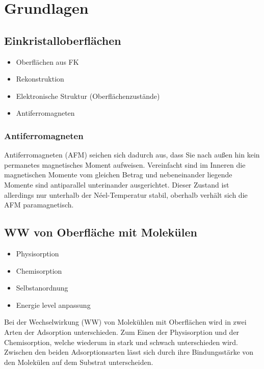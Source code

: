 \chapter{Grundlagen}
    \section{Einkristalloberflächen}
        \begin{itemize}
            \item Oberflächen aus FK
            \item Rekonstruktion
            \item Elektronische Struktur (Oberflächenzustände)
            \item Antiferromagneten
        \end{itemize}
        \subsection{Antiferromagneten}
        Antiferromagneten (AFM) seichen sich dadurch aus, dass Sie nach außen hin kein permanetes magnetisches Moment aufweisen.
        Vereinfacht sind im Inneren die magnetischen Momente vom gleichen Betrag und nebeneinander liegende Momente sind antiparallel unterinander ausgerichtet.
        Dieser Zustand ist allerdings nur unterhalb der Néel-Temperatur stabil, oberhalb verhält sich die AFM paramagnetisch.
    
    \section{WW von Oberfläche mit Molekülen}
        \cite{ma-DJ}
        \begin{itemize}
            \item Physisorption
            \item Chemisorption
            \item Selbstanordnung
            \item Energie level anpassung
        \end{itemize}
        Bei der Wechselwirkung (WW) von Molekühlen mit Oberflächen wird in zwei Arten der Adsorption unterschieden. 
        Zum Einen der Physisorption und der Chemisorption, welche wiederum in stark und schwach unterschieden wird.
        Zwischen den beiden Adsorptionsarten lässt sich durch ihre Bindungsstärke von den Molekülen auf dem Substrat unterscheiden.
